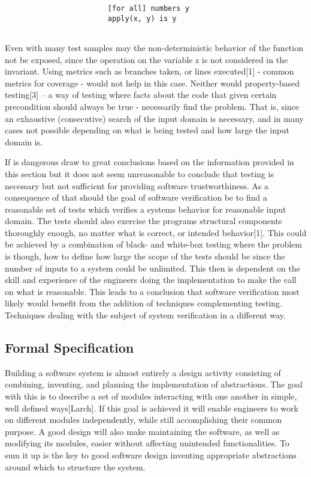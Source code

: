 \documentclass{article}
\begin{document}
\begin{verbatim}
                        [for all] numbers y     
                        apply(x, y) is y
                        
\end{verbatim}

Even with many test samples may the non-deterministic behavior of the function not be exposed, since the operation on the variable z is not considered in the invariant. Using metrics such as branches taken, or lines executed[1] - common metrics for coverage - would not help in this case. Neither would property-based testing[3] – a way of testing where facts about the code that given certain precondition should always be true -  necessarily find the problem. That is, since an exhaustive (consecutive) search of the input domain is necessary, and in many cases not possible depending on what is being tested and how large the input domain is.

If is dangerous draw to great conclusions based on the information provided in this section but it does not seem unreasonable to conclude that testing is necessary but not sufficient for providing software trustworthiness. As a consequence of that should the goal of software verification be to find a reasonable set of tests which verifies a systems behavior for reasonable input domain. The tests should also exercise the programs structural components thoroughly enough, no matter what is correct, or intended behavior[1]. This could be achieved by a combination of black- and white-box testing where the problem is though, how to define how large the scope of the tests should be since the number of inputs to a system could be unlimited. This then is dependent on the skill and experience of the engineers doing the implementation to make the call on what is reasonable. This leads to a conclusion that software verification most likely would benefit from the addition of techniques complementing testing. Techniques dealing with the subject of system verification in a different way. 

\subsection{Formal Specification}\label{formalspec}

Building a software system is almost entirely a design activity consisting of combining, inventing, and planning the implementation of abstractions. The goal with this is to describe a set of modules interacting with one another in simple, well defined ways[Larch]. If this goal is achieved it will enable engineers to work on different modules independently, while still accomplishing their common purpose. A good design will also make maintaining the software, as well as modifying its modules, easier without affecting unintended functionalities. To sum it up is the key to good software design inventing appropriate abstractions around which to structure the system.
\end{document}

